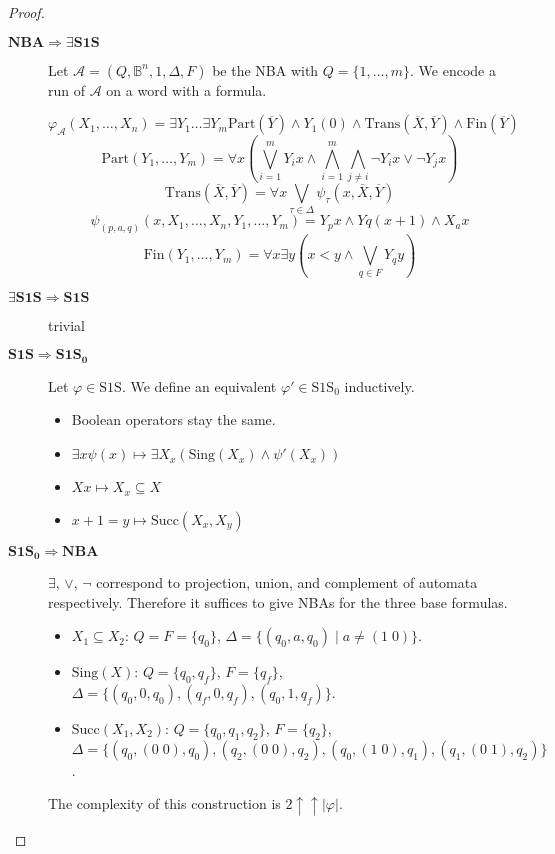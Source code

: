 \documentclass{article}
\begin{document}
\begin{proof}
	\begin{description}
	\item[$\bm{\text{NBA} \Rightarrow \exists \text{S1S}}$] Let $\mathcal{A} = (Q, \mathbb{B}^n, 1, \Delta, F)$ be the NBA with $Q = \{1, \dots, m\}$. We encode a run of $\mathcal{A}$ on a word with a formula. 
	
	$$\varphi_\mathcal{A}(X_1, \dots, X_n) = \exists Y_1 \dots \exists Y_m \text{Part}(\overline{Y}) \land Y_1(0) \land \text{Trans}(\overline{X}, \overline{Y}) \land \text{Fin}(\overline{Y}) $$
	$$ \text{Part}(Y_1, \dots, Y_m) = \forall x \left( \bigvee\limits_{i=1}^m Y_i x \land \bigwedge\limits_{i=1}^m \bigwedge\limits_{j \neq i} \neg Y_i x \lor \neg Y_j x \right) $$
	$$ \text{Trans}(\overline{X}, \overline{Y}) = \forall x \bigvee\limits_{\tau \in \Delta} \psi_\tau(x, \overline{X}, \overline{Y}) $$
	$$ \psi_{(p, a, q)}(x, X_1, \dots, X_n, Y_1, \dots, Y_m) = Y_p x \land Y q (x+1) \land X_a x $$
	$$ \text{Fin}(Y_1, \dots, Y_m) = \forall x \exists y \left( x < y \land \bigvee\limits_{q \in F} Y_q y \right) $$
	
	\item[$\bm{\exists \text{S1S} \Rightarrow \text{S1S}}$] trivial
	
	\item[$\bm{\text{S1S} \Rightarrow \text{S1S}_0}$] Let $\varphi \in \text{S1S}$. We define an equivalent $\varphi' \in \text{S1S}_0$ inductively.
	
	\begin{itemize}
		\item Boolean operators stay the same.
		\item $\exists x \psi(x) \mapsto \exists X_x (\text{Sing}(X_x) \land \psi'(X_x))$
		\item $Xx \mapsto X_x \subseteq X$
		\item $x+1 = y \mapsto \text{Succ}(X_x, X_y)$
	\end{itemize}
	
	\item[$\bm{\text{S1S}_0 \Rightarrow \text{NBA}}$] $\exists$, $\lor$, $\neg$ correspond to projection, union, and complement of automata respectively. Therefore it suffices to give NBAs for the three base formulas.
	
	\begin{itemize}
		\item $X_1 \subseteq X_2$: $Q = F = \{q_0\}$, $\Delta = \{(q_0, a, q_0) \mid a \neq (1 \; 0)\}$.
		\item $\text{Sing}(X)$: $Q = \{q_0, q_f\}$, $F = \{q_f\}$, $\Delta = \{(q_0, 0, q_0), (q_f, 0, q_f), (q_0, 1, q_f)\}$.
		\item $\text{Succ}(X_1, X_2)$: $Q = \{q_0, q_1, q_2\}$, $F = \{q_2\}$, \\
		$\Delta = \{ (q_0, (0 \; 0), q_0), (q_2, (0 \; 0), q_2), (q_0, (1 \; 0), q_1), (q_1, (0 \; 1), q_2)\}$.
	\end{itemize}
	
	The complexity of this construction is $2 \uparrow \uparrow |\varphi|$.
	\end{description}
\end{proof}
\end{document}
